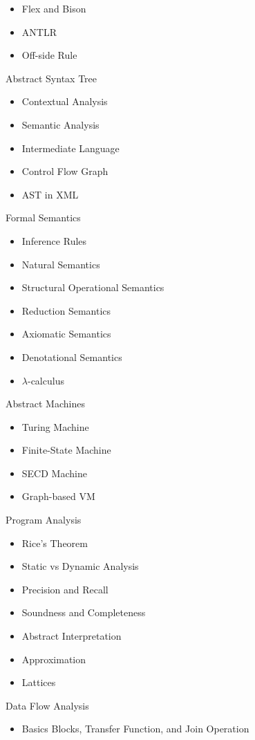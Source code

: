 \documentclass[nobrand,anonymous,nodate,nosecurity]{huawei}
\begin{document}
{\begin{lectures}
\begin{itemize}
	\item Flex and Bison
	\item ANTLR
	\item Off-side Rule
	\end{itemize}
\item Abstract Syntax Tree
	\begin{itemize}
	\item Contextual Analysis
	\item Semantic Analysis
	\item Intermediate Language
	\item Control Flow Graph
	\item AST in XML
	\end{itemize}
\item Formal Semantics
	\begin{itemize}
	\item Inference Rules
	\item Natural Semantics
	\item Structural Operational Semantics
	\item Reduction Semantics
	\item Axiomatic Semantics
	\item Denotational Semantics
	\item $\lambda$-calculus
	\end{itemize}
\item Abstract Machines
	\begin{itemize}
	\item Turing Machine
	\item Finite-State Machine
	\item SECD Machine
	\item Graph-based VM
	\end{itemize}
\item Program Analysis
	\begin{itemize}
	\item Rice's Theorem
	\item Static vs Dynamic Analysis
	\item Precision and Recall
	\item Soundness and Completeness
	\item Abstract Interpretation
	\item Approximation
	\item Lattices
	\end{itemize}
\item Data Flow Analysis
	\begin{itemize}
	\item Basics Blocks, Transfer Function, and Join Operation

\end{itemize}
\end{lectures}}
\end{document}
